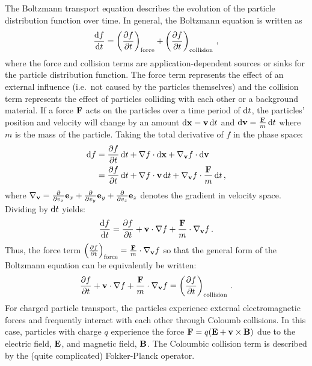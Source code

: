 \documentclass[../doc.tex]{subfiles}
\begin{document}
The Boltzmann transport equation describes the evolution of the particle distribution function over time. In general, the Boltzmann equation is written as 
	\begin{equation}
		\dderiv{f}{t} = \paren{\pderiv{f}{t}}_\text{force} + \paren{\pderiv{f}{t}}_\text{collision} \,,
	\end{equation}
where the force and collision terms are application-dependent sources or sinks for the particle distribution function. The force term represents the effect of an external influence (i.e.~not caused by the particles themselves) and the collision term represents the effect of particles colliding with each other or a background material. If a force $\F$ acts on the particles over a time period of $\ud t$, the particles' position and velocity will change by an amount $\ud \x = \v\ud t$ and $\ud \v = \frac{\F}{m} \ud t$ where $m$ is the mass of the particle. Taking the total derivative of $f$ in the phase space: 
	\begin{equation}
	\begin{aligned}
		\ud f &= \pderiv{f}{t} \ud t + \nabla f \cdot\ud \x + \nabla_{\v} f \cdot\ud \v \\
		&= \pderiv{f}{t} \ud t + \nabla f \cdot\v \ud t + \nabla_{\v}f \cdot\frac{\F}{m} \ud t \,, 
	\end{aligned}
	\end{equation}
where $\nabla_{\v} = \pderiv{}{v_x} \e_x + \pderiv{}{v_y}\e_y + \pderiv{}{v_z} \e_z$ denotes the gradient in velocity space. 
Dividing by $\ud t$ yields: 
	\begin{equation}
		\dderiv{f}{t} = \pderiv{f}{t} + \v \cdot \nabla f + \frac{\F}{m} \cdot \nabla_{\v} f \,. 
	\end{equation}
Thus, the force term $\paren{\pderiv{f}{t}}_\text{force} = \frac{\F}{m}\cdot\nabla_{\v} f$ so that the general form of the Boltzmann equation can be equivalently be written: 
	\begin{equation}
		\pderiv{f}{t} + \v \cdot \nabla f + \frac{\F}{m} \cdot \nabla_{\v} f = \paren{\pderiv{f}{t}}_\text{collision} \,. 
	\end{equation}
For charged particle transport, the particles experience external electromagnetic forces and frequently interact with each other through Coloumb collisions. In this case, particles with charge $q$ experience the force $\F = q(\E + \v\times \mat{B})$ due to the electric field, $\E$, and magnetic field, $\mat{B}$. The Coloumbic collision term is described by the (quite complicated) Fokker-Planck operator. 
\end{document}
